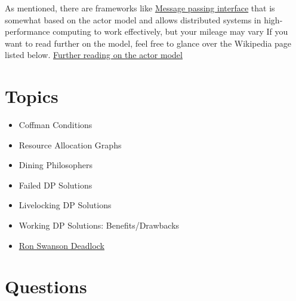 As mentioned, there are frameworks like \href{https://en.wikipedia.org/wiki/Message\_Passing\_Interface}{Message passing interface} that is somewhat based on the actor model and allows distributed systems in high-performance computing to work effectively, but your mileage may vary
If you want to read further on the model, feel free to glance over the Wikipedia page listed below.
\href{https://en.wikipedia.org/wiki/Actor\_model}{Further reading on the actor model}

\section{Topics}

\begin{itemize}
  \item Coffman Conditions
  \item Resource Allocation Graphs
  \item Dining Philosophers
  \item Failed DP Solutions
  \item Livelocking DP Solutions
  \item Working DP Solutions: Benefits/Drawbacks
  \item \href{http://adit.io/posts/2013-05-11-The-Dining-Philosophers-Problem-With-Ron-Swanson.html}{Ron Swanson Deadlock}
\end{itemize}

\section{Questions}

